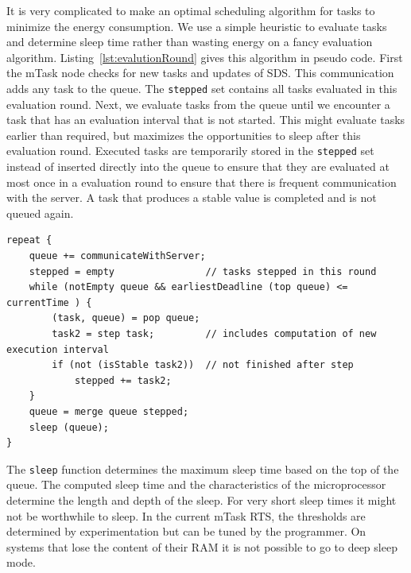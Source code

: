 \documentclass[runningheads]{llncs}
\newcommand{\CleanInline}[1]{\lstinline[language=Clean]!#1!}
\newcommand{\prog}[1]{\CleanInline{#1}}
\begin{document}
It is very complicated to make an optimal scheduling algorithm for tasks to minimize the energy consumption.
We use a simple heuristic to evaluate tasks and determine sleep time rather than wasting energy on a fancy evaluation algorithm.
Listing~\ref{lst:evalutionRound} gives this algorithm in pseudo code.
First the mTask node checks for new tasks and updates of {SDS}.
This communication adds any task to the queue.
The \prog{stepped} set contains all tasks evaluated in this evaluation round.
Next, we evaluate tasks from the queue until we encounter a task that has an evaluation interval that is not started.
This might evaluate tasks earlier than required, but maximizes the opportunities to sleep after this evaluation round.
Executed tasks are temporarily stored in the \prog{stepped} set instead of inserted directly into the queue to ensure that they are evaluated at most once in a evaluation round to ensure that there is frequent communication with the server.
A task that produces a stable value is completed and is not queued again.

\begin{lstlisting}[language=Clean,caption={Pseudo code for the evaluation round of tasks in the queue.},label={lst:evalutionRound}]
repeat {
    queue += communicateWithServer;
    stepped = empty                // tasks stepped in this round
    while (notEmpty queue && earliestDeadline (top queue) <= currentTime ) {
        (task, queue) = pop queue;
        task2 = step task;         // includes computation of new execution interval
        if (not (isStable task2))  // not finished after step
            stepped += task2;
    }
    queue = merge queue stepped;
    sleep (queue);
}
\end{lstlisting}

The \prog{sleep} function determines the maximum sleep time based on the top of the queue.
The computed sleep time and the characteristics of the microprocessor determine the length and depth of the sleep.
For very short sleep times it might not be worthwhile to sleep.
In the current mTask RTS, the thresholds are determined by experimentation but can be tuned by the programmer.
On systems that lose the content of their RAM it is not possible to go to deep sleep mode.

\end{document}
